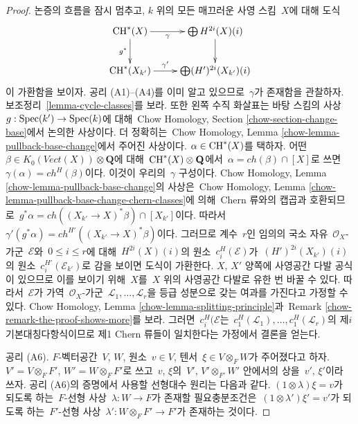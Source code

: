\begin{proof}
\medskip\noindent
논증의 흐름을 잠시 멈추고, $k$ 위의 모든 매끄러운 사영 스킴\ 
$X$에 대해 도식
$$
\xymatrix{
\CH^*(X) \ar[r]_-\gamma \ar[d]_{g^*} & \bigoplus H^{2i}(X)(i) \ar[d] \\
\CH^*(X_{k'}) \ar[r]^-{\gamma'} & \bigoplus (H')^{2i}(X_{k'})(i)
}
$$
이 가환함을 보이자. 공리 (A1)--(A4)를 이미 알고 있으므로\ 
$\gamma$가 존재함을 관찰하자. 보조정리\ 
\ref{lemma-cycle-classes}를 보라. 또한 왼쪽 수직 화살표는 바탕
스킴의 사상\  $g : \mathop{\mathrm{Spec}}(k') \to \mathop{\mathrm{Spec}}(k)$에 대해\  Chow Homology,
Section \ref{chow-section-change-base}에서 논의한 사상이다. 더
정확히는\  Chow Homology, Lemma
\ref{chow-lemma-pullback-base-change}에서 주어진 사상이다.
$\alpha \in \mathop{\mathrm{CH}}\nolimits^*(X)$를 택하자. 어떤\ 
$\beta \in K_0(\textit{Vect}(X)) \otimes \mathbf{Q}$에 대해\ 
$\mathop{\mathrm{CH}}\nolimits^*(X) \otimes \mathbf{Q}$에서\ 
$\alpha = ch(\beta) \cap [X]$로 쓰면\ 
$\gamma(\alpha) = ch^{H}(\beta)$이다. 이것이 우리의\  $\gamma$
구성이다. Chow Homology, Lemma
\ref{chow-lemma-pullback-base-change}의 사상은\  Chow Homology,
Lemma \ref{chow-lemma-pullback-base-change-chern-classes}에 의해\ 
Chern 류와의 캡곱과 호환되므로\ 
$g^*\alpha = ch((X_{k'} \to X)^*\beta) \cap [X_{k'}]$이다. 따라서\ 
$\gamma'(g^*\alpha) = ch^{H'}((X_{k'} \to X)^*\beta)$이다. 그러므로
계수\  $r$인 임의의 국소 자유\  $\mathcal{O}_X$-가군\  $\mathcal{E}$와\ 
$0 \leq i \leq r$에 대해\  $H^{2i}(X)(i)$의 원소\ 
$c_i^H(\mathcal{E})$가\  $(H')^{2i}(X_{k'})(i)$의 원소\ 
$c_i^{H'}(\mathcal{E}_{k'})$로 감을 보이면 도식이 가환한다.
$X$, $X'$ 양쪽에 사영공간 다발 공식이 있으므로 이를 보이기 위해\ 
$X$를\  $X$ 위의 사영공간 다발로 유한 번 바꿀 수 있다. 따라서\ 
$\mathcal{E}$가 가역\  $\mathcal{O}_X$-가군\ 
$\mathcal{L}_1, \ldots, \mathcal{L}_r$을 등급 성분으로 갖는 여과를
가진다고 가정할 수 있다. Chow Homology, Lemma
\ref{chow-lemma-splitting-principle}과\  Remark
\ref{chow-remark-the-proof-shows-more}를 보라. 그러면\ 
$c^H_i(\mathcal{E}$는\ 
$c^H_1(\mathcal{L}_1), \ldots, c^H_1(\mathcal{L}_r)$의 제$i$
기본대칭다항식이므로 제1 Chern 류들이 일치한다는 가정에서 결론을
얻는다.

\medskip\noindent
공리 (A6). $F$-벡터공간\  $V$, $W$, 원소\  $v \in V$, 텐서\ 
$\xi \in V \otimes_F W$가 주어졌다고 하자.
$V' = V \otimes_F F'$, $W' = W \otimes_F F'$로 쓰고\  $v$, $\xi$의\ 
$V'$, $V' \otimes_{F'} W'$ 안에서의 상을\  $v'$, $\xi'$이라 쓰자.
공리 (A6)의 증명에서 사용할 선형대수 원리는 다음과 같다.
$(1 \otimes \lambda)\xi = v$가 되도록 하는\  $F$-선형 사상\ 
$\lambda : W \to F$가 존재할 필요충분조건은\ 
$(1 \otimes \lambda')\xi' = v'$가 되도록 하는\  $F'$-선형 사상\ 
$\lambda' : W \otimes_F F' \to F'$가 존재하는 것이다.


\end{proof}
